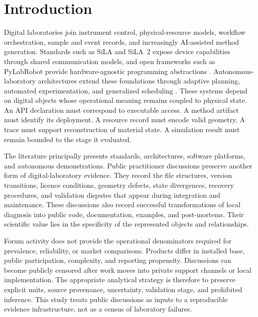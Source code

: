 \section{Introduction}
\label{sec:introduction}

Digital laboratories join instrument control, physical-resource models, workflow orchestration, sample and event records, and increasingly AI-assisted method generation. Standards such as SiLA and SiLA~2 expose device capabilities through shared communication models, and open frameworks such as PyLabRobot provide hardware-agnostic programming abstractions \cite{bar2012sila,juchli2022sila2,porr2020gateway,bromig2022manager,wierenga2023pylabrobot}. Autonomous-laboratory architectures extend these foundations through adaptive planning, automated experimentation, and generalized scheduling \cite{abolhasani2023rise,hung2024community,canty2023autonomy,fei2024alabos,cousty2024glas}. These systems depend on digital objects whose operational meaning remains coupled to physical state. An API declaration must correspond to executable access. A method artifact must identify its deployment. A resource record must encode valid geometry. A trace must support reconstruction of material state. A simulation result must remain bounded to the stage it evaluated.

The literature principally presents standards, architectures, software platforms, and autonomous demonstrations. Public practitioner discussions preserve another form of digital-laboratory evidence. They record the file structures, version transitions, licence conditions, geometry defects, state divergences, recovery procedures, and validation disputes that appear during integration and maintenance. These discussions also record successful transformations of local diagnosis into public code, documentation, examples, and post-mortems. Their scientific value lies in the specificity of the represented objects and relationships.

Forum activity does not provide the operational denominators required for prevalence, reliability, or market comparisons. Products differ in installed base, public participation, complexity, and reporting propensity. Discussions can become publicly censored after work moves into private support channels or local implementation. The appropriate analytical strategy is therefore to preserve explicit units, source provenance, uncertainty, validation stage, and prohibited inference. This study treats public discussions as inputs to a reproducible evidence infrastructure, not as a census of laboratory failures.

